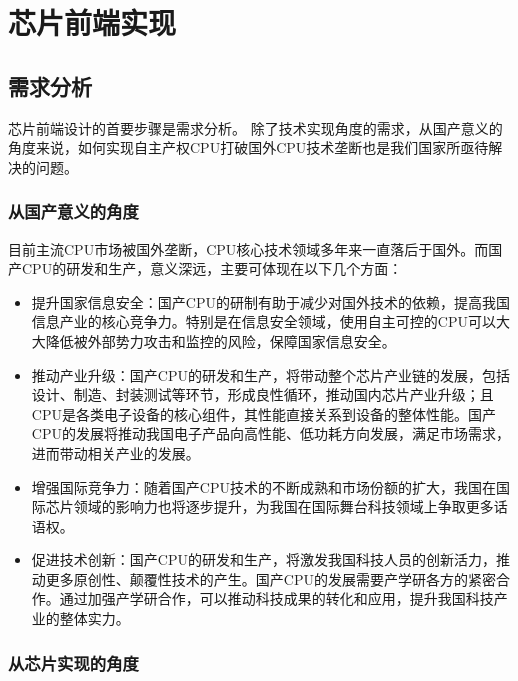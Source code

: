 
\chapter{芯片前端实现}\label{chap:16-chip-frontend}

\section{需求分析}\label{sec:16-chip-frontend-001}

芯片前端设计的首要步骤是需求分析。
除了技术实现角度的需求，从国产意义的角度来说，如何实现自主产权CPU打破国外CPU技术垄断也是我们国家所亟待解决的问题。

\subsection{从国产意义的角度}\label{sec:16-chip-frontend-002}

目前主流CPU市场被国外垄断，CPU核心技术领域多年来一直落后于国外。而国产CPU的研发和生产，意义深远，主要可体现在以下几个方面：

\begin{itemize}
\tightlist
\item
  提升国家信息安全：国产CPU的研制有助于减少对国外技术的依赖，提高我国信息产业的核心竞争力。特别是在信息安全领域，使用自主可控的CPU可以大大降低被外部势力攻击和监控的风险，保障国家信息安全。
\item
  推动产业升级：国产CPU的研发和生产，将带动整个芯片产业链的发展，包括设计、制造、封装测试等环节，形成良性循环，推动国内芯片产业升级；且CPU是各类电子设备的核心组件，其性能直接关系到设备的整体性能。国产CPU的发展将推动我国电子产品向高性能、低功耗方向发展，满足市场需求，进而带动相关产业的发展。
\item
  增强国际竞争力：随着国产CPU技术的不断成熟和市场份额的扩大，我国在国际芯片领域的影响力也将逐步提升，为我国在国际舞台科技领域上争取更多话语权。
\item
  促进技术创新：国产CPU的研发和生产，将激发我国科技人员的创新活力，推动更多原创性、颠覆性技术的产生。国产CPU的发展需要产学研各方的紧密合作。通过加强产学研合作，可以推动科技成果的转化和应用，提升我国科技产业的整体实力。
\end{itemize}

\subsection{从芯片实现的角度}\label{sec:16-chip-frontend-003}

